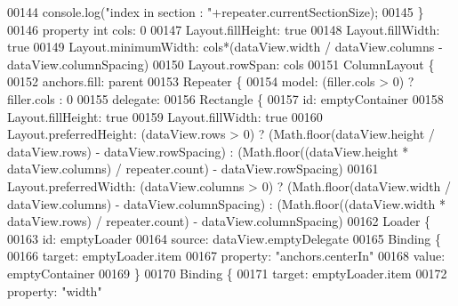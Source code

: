 \begin{DoxyCode}
{00144 \textcolor{comment}{                    console.log("index in section : "+repeater.currentSectionSize);}
00145 \textcolor{comment}{                \}}
00146 \textcolor{comment}{                property int cols: 0}
00147 \textcolor{comment}{                Layout.fillHeight: true}
00148 \textcolor{comment}{                Layout.fillWidth: true}
00149 \textcolor{comment}{                Layout.minimumWidth: cols*(dataView.width / dataView.columns  - dataView.columnSpacing)}
00150 \textcolor{comment}{                Layout.rowSpan: cols}
00151 \textcolor{comment}{                ColumnLayout \{}
00152 \textcolor{comment}{                    anchors.fill: parent}
00153 \textcolor{comment}{                    Repeater \{}
00154 \textcolor{comment}{                        model: (filler.cols > 0) ? filler.cols : 0}
00155 \textcolor{comment}{                        delegate:}
00156 \textcolor{comment}{                            Rectangle \{}
00157 \textcolor{comment}{                            id: emptyContainer}
00158 \textcolor{comment}{                            Layout.fillHeight: true}
00159 \textcolor{comment}{                            Layout.fillWidth: true}
00160 \textcolor{comment}{                            Layout.preferredHeight: (dataView.rows > 0) ? (Math.floor(dataView.height /
       dataView.rows) - dataView.rowSpacing) : (Math.floor((dataView.height * dataView.columns) / repeater.count) -
       dataView.rowSpacing)}
00161 \textcolor{comment}{                            Layout.preferredWidth: (dataView.columns > 0) ? (Math.floor(dataView.width /
       dataView.columns) - dataView.columnSpacing) : (Math.floor((dataView.width * dataView.rows) / repeater.count) -
       dataView.columnSpacing)}
00162 \textcolor{comment}{                            Loader \{}
00163 \textcolor{comment}{                                id: emptyLoader}
00164 \textcolor{comment}{                                source: dataView.emptyDelegate}
00165 \textcolor{comment}{                                Binding \{}
00166 \textcolor{comment}{                                    target: emptyLoader.item}
00167 \textcolor{comment}{                                    property: "anchors.centerIn"}
00168 \textcolor{comment}{                                    value: emptyContainer}
00169 \textcolor{comment}{                                \}}
00170 \textcolor{comment}{                                Binding \{}
00171 \textcolor{comment}{                                    target: emptyLoader.item}
00172 \textcolor{comment}{                                    property: "width"}
}
\end{DoxyCode}
